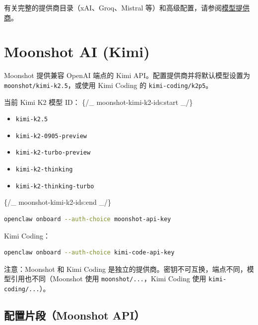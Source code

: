 有关完整的提供商目录（xAI、Groq、Mistral 等）和高级配置，请参阅\href{/concepts/model-providers}{模型提供商}。


\clearpage

\section{Moonshot AI (Kimi)}


Moonshot 提供兼容 OpenAI 端点的 Kimi API。配置提供商并将默认模型设置为 \texttt{moonshot/kimi-k2.5}，或使用 Kimi Coding 的 \texttt{kimi-coding/k2p5}。

当前 Kimi K2 模型 ID：
\{/\_ moonshot-kimi-k2-ids:start \_/\}

\begin{itemize}
  \item \texttt{kimi-k2.5}
  \item \texttt{kimi-k2-0905-preview}
  \item \texttt{kimi-k2-turbo-preview}
  \item \texttt{kimi-k2-thinking}
  \item \texttt{kimi-k2-thinking-turbo}
\end{itemize}

\{/\_ moonshot-kimi-k2-ids:end \_/\}

\begin{lstlisting}[language=bash]
openclaw onboard --auth-choice moonshot-api-key
\end{lstlisting}


Kimi Coding：

\begin{lstlisting}[language=bash]
openclaw onboard --auth-choice kimi-code-api-key
\end{lstlisting}


注意：Moonshot 和 Kimi Coding 是独立的提供商。密钥不可互换，端点不同，模型引用也不同（Moonshot 使用 \texttt{moonshot/...}，Kimi Coding 使用 \texttt{kimi-coding/...}）。

\subsection{配置片段（Moonshot API）}


